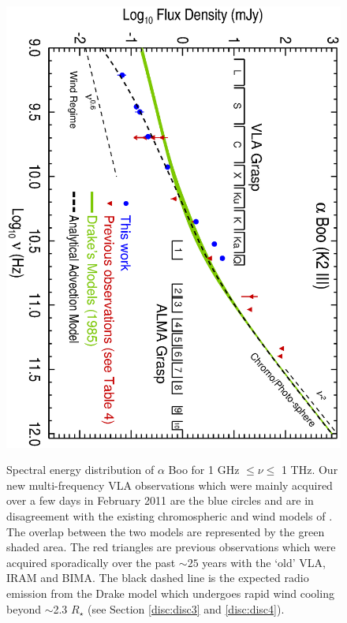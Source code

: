 \documentclass[iop]{emulateapj}
\begin{document}
\begin{figure}
\centering
\includegraphics[trim = 0mm 0mm 0mm 20mm, clip,scale=0.65, angle=90]{fig1.ps}
\\
\caption{Spectral energy distribution of $\alpha$ Boo for 1 GHz $\leq \nu \leq$ 1 THz. Our new multi-frequency VLA observations which were mainly acquired over a few days in February 2011 are the blue circles and are in disagreement with the existing chromospheric and wind models of \cite{1985pssl.proc..351D}. The overlap between the two models are represented by the green shaded area. The red triangles are previous observations which were acquired sporadically over the past $\sim25$ years with the `old' VLA, IRAM and BIMA. The black dashed line is the expected radio emission from the Drake model which undergoes rapid wind cooling beyond $\sim$2.3 $R_{\star}$ (see Section \ref{disc:disc3} and \ref{disc:disc4}).}
\label{fig:fig1}
\centering

\end{figure}
\end{document}
